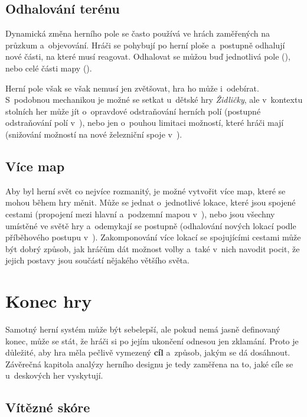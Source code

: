 \subsection{Odhalování terénu}
\label{subsec:movement_map_reveal}

Dynamická změna herního pole se často používá ve hrách zaměřených na průzkum a~objevování. Hráči se pohybují po herní ploše a~postupně odhalují nové části, na které musí reagovat. Odhalovat se můžou buď jednotlivá pole (), nebo celé části mapy ().

Herní pole však se však nemusí jen zvětšovat, hra ho může i~odebírat. S~podobnou mechanikou je možné se setkat u~dětské hry \textit{Židličky}, ale v~kontextu stolních her může jít o~opravdové odstraňování herních polí (postupné odstraňování polí v~), nebo jen o~pouhou limitaci možností, které hráči mají (snižování možností na nové železniční spoje v~).

\subsection{Více map}
\label{subsec:movement_multiple_maps}

Aby byl herní svět co nejvíce rozmanitý, je možné vytvořit více map, které se mohou během hry měnit. Může se jednat o~jednotlivé lokace, které jsou spojené cestami (propojení mezi hlavní a~podzemní mapou v~), nebo jsou všechny umístěné ve světě hry a~odemykají se postupně (odhalování nových lokací podle příběhového postupu v~). Zakomponování více lokací se spojujícími cestami může být dobrý způsob, jak hráčům dát možnost volby a~také v~nich navodit pocit, že jejich postavy jsou součástí nějakého většího světa.



\section{Konec hry}
\label{sec:end}

Samotný herní systém může být sebelepší, ale pokud nemá jasně definovaný konec, může se stát, že hráči si po jejím ukončení odnesou jen zklamání. Proto je důležité, aby hra měla pečlivě vymezený \textbf{cíl} a~způsob, jakým se dá dosáhnout. Závěrečná kapitola analýzy herního designu je tedy zaměřena na to, jaké cíle se u~deskových her vyskytují.

\subsection{Vítězné skóre}
\label{subsec:end_victory_points}


